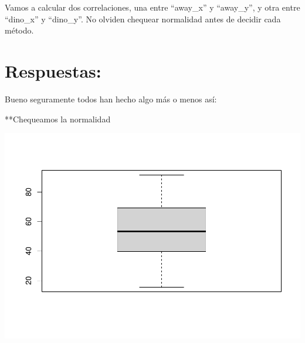 \documentclass[
]{book}
\newenvironment{Shaded}{\begin{snugshade}}{\end{snugshade}}
\newcommand{\CommentTok}[1]{\textcolor[rgb]{0.56,0.35,0.01}{\textit{#1}}}
\newcommand{\FunctionTok}[1]{\textcolor[rgb]{0.00,0.00,0.00}{#1}}
\newcommand{\NormalTok}[1]{#1}
\newcommand{\SpecialCharTok}[1]{\textcolor[rgb]{0.00,0.00,0.00}{#1}}
\begin{document}
Vamos a calcular dos correlaciones, una entre ``away\_x'' y ``away\_y'', y otra entre ``dino\_x'' y ``dino\_y''. No olviden chequear normalidad antes de decidir cada método.

\hypertarget{respuestas-6}{%
\section{\texorpdfstring{ Respuestas:}{ Respuestas:}}\label{respuestas-6}}

Bueno seguramente todos han hecho algo más o menos así:

**Chequeamos la normalidad

\begin{Shaded}
\end{Shaded}

\includegraphics{Esatadistica_en_R_files/figure-latex/unnamed-chunk-213-1.pdf}

\begin{Shaded}
\end{Shaded}
\end{document}
